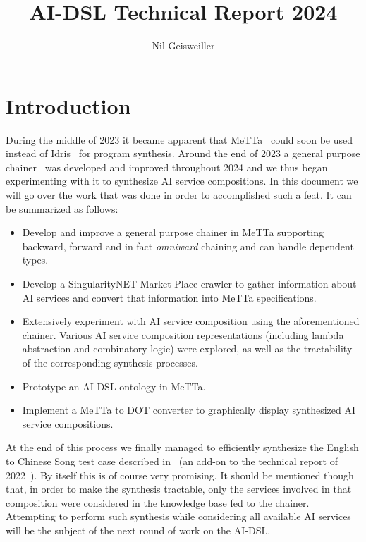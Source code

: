 \documentclass[]{report}
\begin{document}
\title{AI-DSL Technical Report 2024}
\author{Nil Geisweiller}
\maketitle

\begin{abstract}
\end{abstract}

\tableofcontents

\chapter{Introduction}

During the middle of 2023 it became apparent that MeTTa~\cite{MeTTa}
could soon be used instead of Idris~\cite{Idris} for program
synthesis.  Around the end of 2023 a general purpose
chainer~\cite{Chaining} was developed and improved throughout 2024 and
we thus began experimenting with it to synthesize AI service
compositions.  In this document we will go over the work that was done
in order to accomplished such a feat.  It can be summarized as
follows:
\begin{itemize}
\item Develop and improve a general purpose chainer in MeTTa
  supporting backward, forward and in fact \emph{omniward} chaining
  and can handle dependent types.
\item Develop a SingularityNET Market Place crawler to gather
  information about AI services and convert that information into
  MeTTa specifications.
\item Extensively experiment with AI service composition using the
  aforementioned chainer.  Various AI service composition
  representations (including lambda abstraction and combinatory logic)
  were explored, as well as the tractability of the corresponding
  synthesis processes.
\item Prototype an AI-DSL ontology in MeTTa.
\item Implement a MeTTa to DOT converter to graphically display
  synthesized AI service compositions.
\end{itemize}
At the end of this process we finally managed to efficiently
synthesize the English to Chinese Song test case described
in~\cite{AIDSLService2023} (an add-on to the technical report of
2022~\cite{AIDSLReport2022}).  By itself this is of course very
promising.  It should be mentioned though that, in order to make the
synthesis tractable, only the services involved in that composition
were considered in the knowledge base fed to the chainer.  Attempting
to perform such synthesis while considering all available AI services
will be the subject of the next round of work on the AI-DSL.
\end{document}
